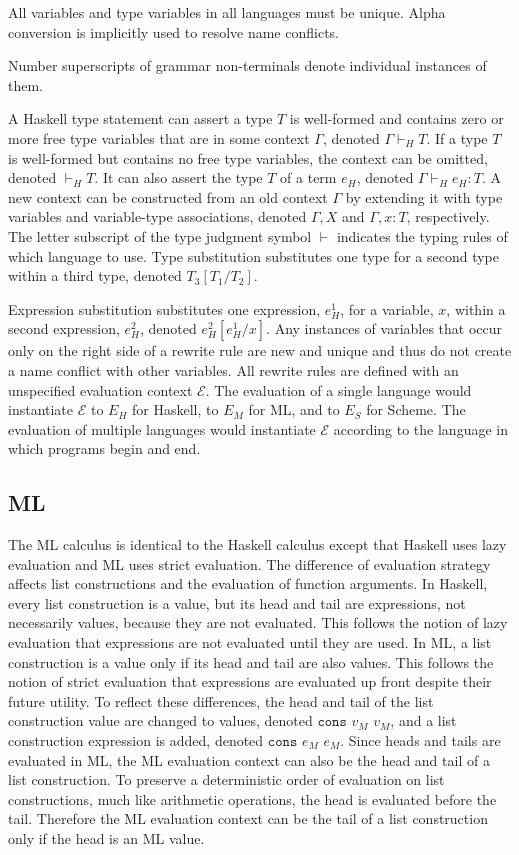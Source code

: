 All variables and type variables in all languages must be unique.  Alpha conversion is implicitly used to resolve name conflicts.

Number superscripts of grammar non-terminals denote individual instances of them.

A Haskell type statement can assert a type $T$ is well-formed and contains zero or more free type variables that are in some context $\Gamma$, denoted $\Gamma\vdash_{H}T$.  If a type $T$ is well-formed but contains no free type variables, the context can be omitted, denoted $\vdash_{H}T$.  It can also assert the type $T$ of a term $e_{H}$, denoted $\Gamma\vdash_{H}e_{H}:T$.  A new context can be constructed from an old context $\Gamma$ by extending it with type variables and variable-type associations, denoted $\Gamma,X$ and $\Gamma,x:T$, respectively.  The letter subscript of the type judgment symbol $\vdash$ indicates the typing rules of which language to use.  Type substitution substitutes one type for a second type within a third type, denoted $T_{3}[T_{1}/T_{2}]$.

Expression substitution substitutes one expression, $e_{H}^{1}$, for a variable, $x$, within a second expression, $e_{H}^{2}$, denoted $e_{H}^{2}[e_{H}^{1}/x]$.  Any instances of variables that occur only on the right side of a rewrite rule are new and unique and thus do not create a name conflict with other variables.  All rewrite rules are defined with an unspecified evaluation context $\mathscr{E}$.  The evaluation of a single language would instantiate $\mathscr{E}$ to $E_{H}$ for Haskell, to $E_{M}$ for ML, and to $E_{S}$ for Scheme.  The evaluation of multiple languages would instantiate $\mathscr{E}$ according to the language in which programs begin and end.

\subsection{ML}

The ML calculus is identical to the Haskell calculus except that Haskell uses lazy evaluation and ML uses strict evaluation.  The difference of evaluation strategy affects list constructions and the evaluation of function arguments.  In Haskell, every list construction is a value, but its head and tail are expressions, not necessarily values, because they are not evaluated.  This follows the notion of lazy evaluation that expressions are not evaluated until they are used.  In ML, a list construction is a value only if its head and tail are also values.  This follows the notion of strict evaluation that expressions are evaluated up front despite their future utility.  To reflect these differences, the head and tail of the list construction value are changed to values, denoted $\mathtt{cons}$ $v_{M}$ $v_{M}$, and a list construction expression is added, denoted $\mathtt{cons}$ $e_{M}$ $e_{M}$.  Since heads and tails are evaluated in ML, the ML evaluation context can also be the head and tail of a list construction.  To preserve a deterministic order of evaluation on list constructions, much like arithmetic operations, the head is evaluated before the tail.  Therefore the ML evaluation context can be the tail of a list construction only if the head is an ML value.  


